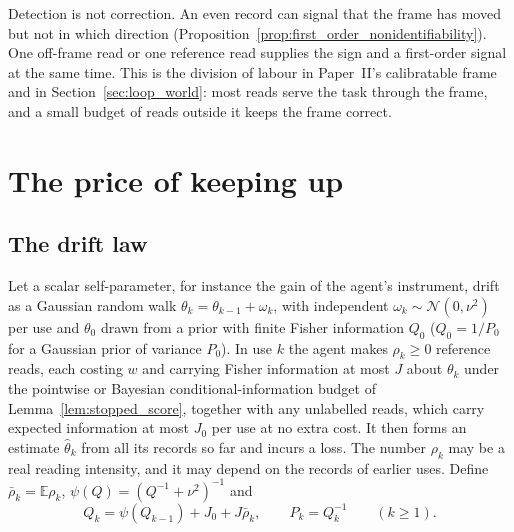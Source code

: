 \documentclass[12pt]{article}
\theoremstyle{definition}
\newcommand{\E}{\mathbb E}
\begin{document}
Detection is not correction. An even record can signal that the frame has moved but not in which direction (Proposition~\ref{prop:first_order_nonidentifiability}). One off-frame read or one reference read supplies the sign and a first-order signal at the same time. This is the division of labour in Paper~II's calibratable frame and in Section~\ref{sec:loop_world}: most reads serve the task through the frame, and a small budget of reads outside it keeps the frame correct.

\section{The price of keeping up}
\label{sec:price}

\subsection{The drift law}
\label{subsec:driftlaw}

Let a scalar self-parameter, for instance the gain of the agent's instrument, drift as a Gaussian random walk $\theta_k=\theta_{k-1}+\omega_k$, with independent $\omega_k\sim\mathcal N(0,\nu^2)$ per use and $\theta_0$ drawn from a prior with finite Fisher information $Q_0$ ($Q_0=1/P_0$ for a Gaussian prior of variance $P_0$). In use $k$ the agent makes $\rho_k\ge0$ reference reads, each costing $w$ and carrying Fisher information at most $J$ about $\theta_k$ under the pointwise or Bayesian conditional-information budget of Lemma~\ref{lem:stopped_score}, together with any unlabelled reads, which carry expected information at most $J_0$ per use at no extra cost. It then forms an estimate $\hat\theta_k$ from all its records so far and incurs a loss. The number $\rho_k$ may be a real reading intensity, and it may depend on the records of earlier uses. Define $\bar\rho_k=\E\rho_k$, $\psi(Q)=(Q^{-1}+\nu^2)^{-1}$ and
\begin{equation}
\label{eq:pcrb}
Q_k=\psi(Q_{k-1})+J_0+J\bar\rho_k,\qquad P_k=Q_k^{-1}\qquad(k\ge1).
\end{equation}
\end{document}
